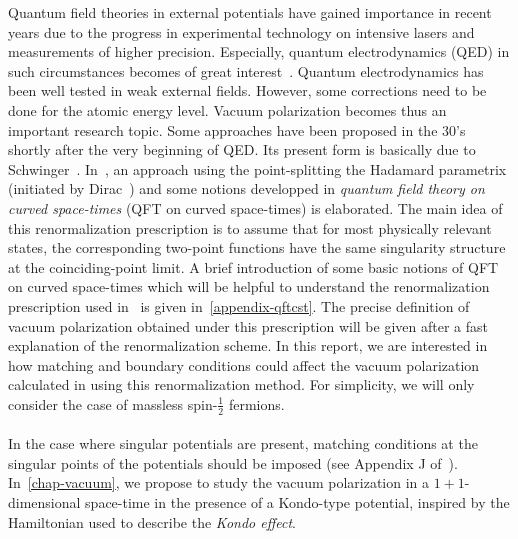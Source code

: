 Quantum field theories in external potentials have gained importance in recent years due to the progress in experimental technology on intensive lasers and measurements of higher precision.
Especially, quantum electrodynamics (QED) in such circumstances becomes of great interest~\cite{Mohr1998}. 
Quantum electrodynamics has been well tested in weak external fields.
However, some corrections need to be done for the atomic energy level. 
Vacuum polarization becomes thus an important research topic. 
Some approaches have been proposed in the 30's shortly after the very beginning of QED.
Its present form is basically due to Schwinger~\cite{Schwinger1951}. 
In~\cite{Zahn2015}, an approach using the point-splitting \wrt the Hadamard parametrix (initiated by Dirac~\cite{Dirac1934}) and some notions developped in \textit{quantum field theory on curved space-times} (QFT on curved space-times) is elaborated. 
The main idea of this renormalization prescription is to assume that for most physically relevant states,
the corresponding two-point functions have the same singularity structure at the coinciding-point limit. 
A brief introduction of some basic notions of QFT on curved space-times which will be helpful to understand the renormalization prescription used in~\cite{Zahn2015} is given in~\cref{appendix-qftcst}.
The precise definition of vacuum polarization obtained under this prescription will be given after a fast explanation of the renormalization scheme.
In this report, we are interested in how matching and boundary conditions could affect the vacuum polarization calculated in using this renormalization method. 
For simplicity,
we will only consider the case of massless spin-$\frac 1 2$ fermions.
\\\\
%
In the case where singular potentials are present, 
matching conditions at the singular points of the potentials should be imposed (see \eg Appendix J of~\cite{albeverio1988solvable}).
In~\cref{chap-vacuum}, we propose to study the vacuum polarization in a
$1+1$-dimensional space-time in the presence of a Kondo-type potential, inspired by the Hamiltonian used to describe the \textit{Kondo effect}.
